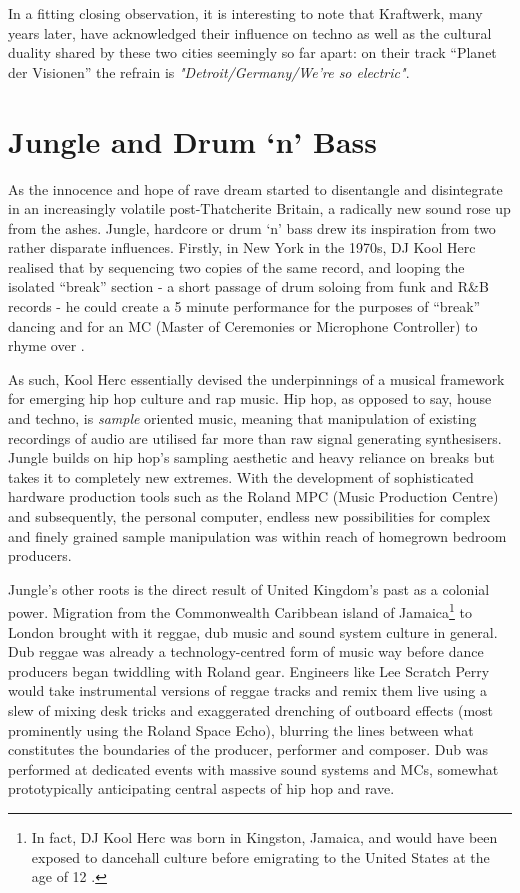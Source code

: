 In a fitting closing observation, it is interesting to note that Kraftwerk, many years later, have acknowledged their influence on techno as well as the cultural duality shared by these two cities seemingly so far apart: on their track “Planet der Visionen” the refrain is \textit{"Detroit/Germany/We're so electric"}.

\section{Jungle and Drum ‘n’ Bass}

As the innocence and hope of rave dream started to disentangle and disintegrate in an increasingly volatile post-Thatcherite Britain, a radically new sound rose up from the ashes. Jungle, hardcore or drum ‘n’ bass drew its inspiration from two rather disparate influences. Firstly, in New York in the 1970s, DJ Kool Herc realised that by sequencing two copies of the same record, and looping the isolated “break” section - a short passage of drum soloing from funk and R\&B records - he could create a 5 minute performance for the purposes of “break” dancing and for an MC (Master of Ceremonies or Microphone Controller) to rhyme over \citep{Smith2000}. 

As such, Kool Herc essentially devised the underpinnings of a musical framework for emerging hip hop culture and rap music. Hip hop, as opposed to say, house and techno, is \textit{sample} oriented music, meaning that manipulation of existing recordings of audio are utilised far more than raw signal generating synthesisers. Jungle builds on hip hop’s sampling aesthetic and heavy reliance on breaks but takes it to completely new extremes. With the development of sophisticated hardware production tools such as the Roland MPC (Music Production Centre) and subsequently, the personal computer, endless new possibilities for complex and finely grained sample manipulation was within reach of homegrown bedroom producers.

Jungle’s other roots is the direct result of United Kingdom’s past as a colonial power. Migration from the Commonwealth Caribbean island of Jamaica\footnote{In fact, DJ Kool Herc was born in Kingston, Jamaica, and would have been exposed to dancehall culture before emigrating to the United States at the age of 12 \citep{Chang2007}.} to London brought with it reggae, dub music and sound system culture in general. Dub reggae was already a technology-centred form of music way before dance producers began twiddling with Roland gear. Engineers like Lee Scratch Perry would take instrumental versions of reggae tracks and remix them live using a slew of mixing desk tricks and exaggerated drenching of outboard effects (most prominently using the Roland Space Echo), blurring the lines between what constitutes the boundaries of the producer, performer and composer. Dub was performed at dedicated events with massive sound systems and MCs, somewhat prototypically anticipating central aspects of hip hop and rave. 

